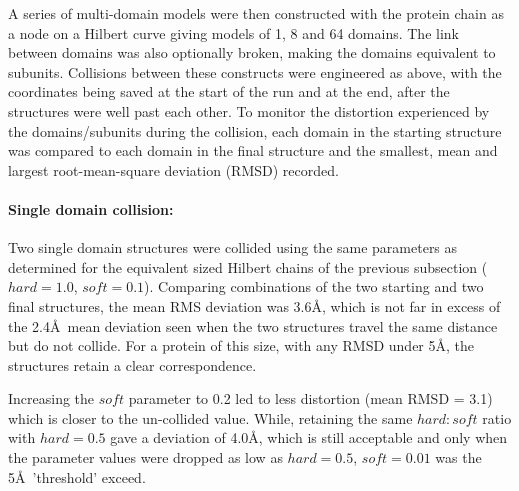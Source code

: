 A series of multi-domain models were then constructed with the protein chain as a
node on a Hilbert curve giving models of 1, 8 and 64 domains.   The link between 
domains was also optionally broken, making the domains equivalent to subunits.
Collisions between these constructs were engineered as above, with the coordinates
being saved at the start of the run and at the end, after the structures were well
past each other.    To monitor the distortion experienced by the domains/subunits
during the collision, each domain in the starting structure was compared to each
domain in the final structure and the smallest, mean and largest root-mean-square
deviation (RMSD) recorded. 

\paragraph{Single domain collision:\\}

Two single domain structures were collided using the same parameters as determined
for the equivalent sized Hilbert chains of the previous subsection ($hard = 1.0$, $soft = 0.1$).
Comparing combinations of the two starting and two final structures, the mean RMS
deviation was 3.6\AA , which is not far in excess of the 2.4\AA\ mean deviation seen
when the two structures travel the same distance but do not collide.   For a protein
of this size, with any RMSD under 5\AA, the structures retain a clear correspondence. 

Increasing the $soft$ parameter to 0.2 led to less distortion (mean RMSD = 3.1) which
is closer to the un-collided value.   While, retaining the same $hard:soft$ ratio
with $hard = 0.5$ gave a deviation of 4.0\AA, which is still acceptable and only
when the parameter values were dropped as low as $hard = 0.5$, $soft = 0.01$ was the
5\AA\ 'threshold' exceed.  

